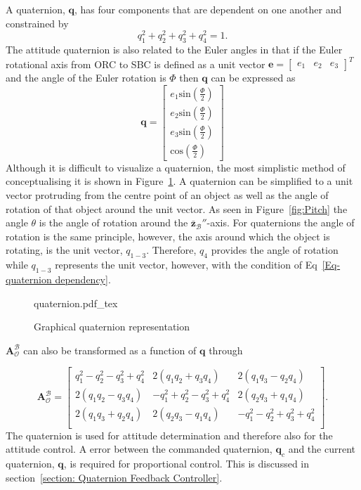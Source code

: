 A quaternion, $\mathbf{q}$, has four components that are dependent on one another and constrained by 
\begin{equation} 
\label{Eq-quaternion dependency}
q_1^2 + q_2^2 + q_3^2 + q_4^2 = 1.
\end{equation}
The attitude quaternion is also related to the Euler angles in that if the Euler rotational axis from ORC to SBC is defined as a unit vector $\mathbf{e} = \begin{bmatrix} e_1  & e_2 & e_3 \end{bmatrix}^T$ and the angle of the Euler rotation is $\Phi$ then $\mathbf{q}$ can be expressed as
\begin{equation}
\mathbf{q} = \begin{bmatrix} e_1 \text{sin}(\frac{\Phi}{2}) \\ e_2 \text{sin}(\frac{\Phi}{2}) \\ e_3 \text{sin}(\frac{\Phi}{2}) \\ \text{cos}(\frac{\Phi}{2}) \end{bmatrix}
\end{equation}
Although it is difficult to visualize a quaternion, the most simplistic method of conceptualising it is shown in Figure~\ref{fig:quaternion}. A quaternion can be simplified to a unit vector protruding from the centre point of an object as well as the angle of rotation of that object around the unit vector. As seen in Figure~\ref{fig:Pitch} the angle $\theta$ is the angle of rotation around the $\bar{\mathbf{z}}_\mathcal{B}''$-axis. For quaternions the angle of rotation is the same principle, however, the axis around which the object is rotating, is the unit vector, $q_{1-3}$. Therefore, $q_4$ provides the angle of rotation while $q_{1-3}$ represents the unit vector, however, with the condition of Eq~\ref{Eq-quaternion dependency}.

\begin{figure}[!htb]
	\centering
	\def\svgwidth{10cm}
	{quaternion.pdf_tex}
	\caption{Graphical quaternion representation}
	\label{fig:quaternion}
\end{figure}

$\boldsymbol{A}^{\mathcal{B}}_{\mathcal{O}}$ can also be transformed as a function of $\mathbf{q}$ \cite{wertz2012spacecraft} through

\begin{equation}
\label{eq:DCM_quaternion}
	\boldsymbol{A}^{\mathcal{B}}_{\mathcal{O}}
		= \begin{bmatrix}
		q_1^2 - q_2^2 - q_3^2 + q_4^2 & 2(q_1q_2 + q_3q_4) & 2(q_1q_3 - q_2q_4) \\
		2(q_1q_2 - q_3q_4) & -q_1^2 + q_2^2 - q_3^2 + q_4^2 & 2(q_2q_3 + q_1q_4) \\
		2(q_1q_3 + q_2q_4) & 2(q_2q_3 - q_1q_4) & -q_1^2 - q_2^2 + q_3^2 + q_4^2 \\
		\end{bmatrix}.
\end{equation}
The quaternion is used for attitude determination and therefore also for the attitude control. A error between the commanded quaternion, $\mathbf{q}_c$ and the current quaternion, $\mathbf{q}$, is required for proportional control. This is discussed in section~\ref{section: Quaternion Feedback Controller}.

